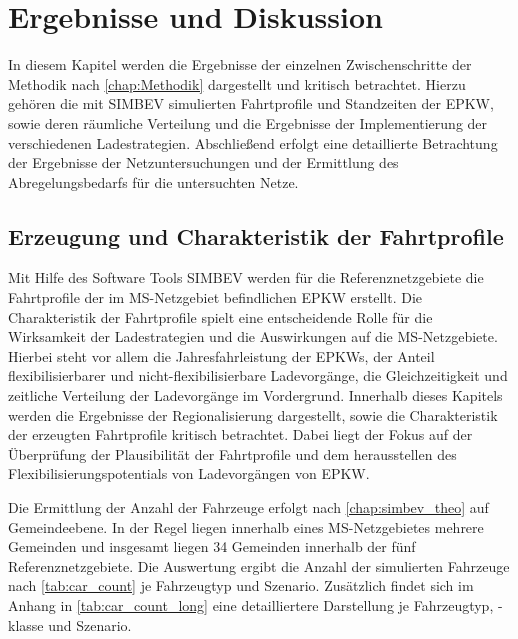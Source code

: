 \section{Ergebnisse und Diskussion}\label{chap:results}

In diesem Kapitel werden die Ergebnisse der einzelnen Zwischenschritte der Methodik nach \autoref{chap:Methodik} dargestellt und kritisch betrachtet.
Hierzu gehören die mit \gls{SIMBEV} simulierten Fahrtprofile und Standzeiten der \gls{EPKW}, sowie deren räumliche Verteilung und die Ergebnisse der Implementierung der verschiedenen Ladestrategien.
Abschließend erfolgt eine detaillierte Betrachtung der Ergebnisse der Netzuntersuchungen und der Ermittlung des Abregelungsbedarfs für die untersuchten Netze.


\subsection{Erzeugung und Charakteristik der Fahrtprofile}

Mit Hilfe des Software Tools \gls{SIMBEV} werden für die Referenznetzgebiete die Fahrtprofile der im \gls{MS}-Netzgebiet befindlichen \gls{EPKW} erstellt.
Die Charakteristik der Fahrtprofile spielt eine entscheidende Rolle für die Wirksamkeit der Ladestrategien und die Auswirkungen auf die \gls{MS}-Netzgebiete.
Hierbei steht vor allem die Jahresfahrleistung der \glspl{EPKW}, der Anteil flexibilisierbarer und nicht-flexibilisierbare Ladevorgänge, die Gleichzeitigkeit und zeitliche Verteilung der Ladevorgänge im Vordergrund.
Innerhalb dieses Kapitels werden die Ergebnisse der Regionalisierung dargestellt, sowie die Charakteristik der erzeugten Fahrtprofile kritisch betrachtet.
Dabei liegt der Fokus auf der Überprüfung der Plausibilität der Fahrtprofile und dem herausstellen des Flexibilisierungspotentials von Ladevorgängen von \gls{EPKW}.\medskip

Die Ermittlung der Anzahl der Fahrzeuge erfolgt nach \autoref{chap:simbev_theo} auf Gemeindeebene.
In der Regel liegen innerhalb eines \gls{MS}-Netzgebietes mehrere Gemeinden und insgesamt liegen \num{34} Gemeinden innerhalb der fünf Referenznetzgebiete.
Die Auswertung ergibt die Anzahl der simulierten Fahrzeuge nach \autoref{tab:car_count} je Fahrzeugtyp und Szenario.
Zusätzlich findet sich im Anhang in \autoref{tab:car_count_long} eine detailliertere Darstellung je Fahrzeugtyp, -klasse und Szenario.



